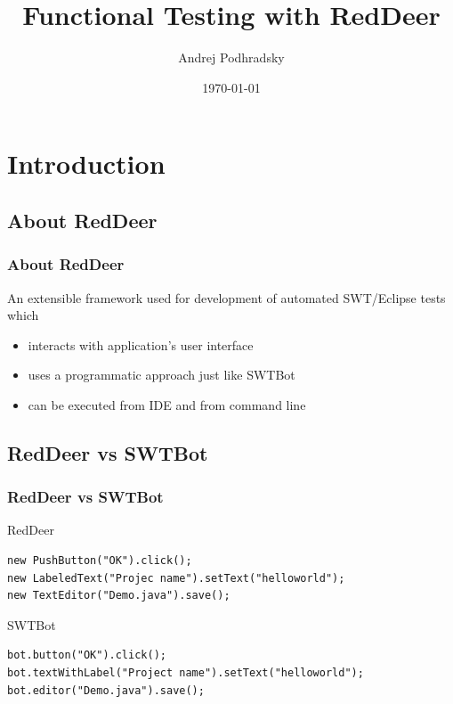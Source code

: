 \documentclass{beamer}
\begin{document}
\title{Functional Testing with RedDeer}   
\author{Andrej Podhradsky}
\date{\today} 



\frame{\titlepage} 



\section{Introduction}

\subsection{About RedDeer}
\begin{frame}[fragile]
\frametitle{About RedDeer}
An extensible framework used for development of automated SWT/Eclipse tests which
\begin{itemize}
\item interacts with application’s user interface
\item uses a programmatic approach just like SWTBot
\item can be executed from IDE and from command line
\end{itemize}
\end{frame}

\subsection{RedDeer vs SWTBot}
\begin{frame}[fragile]
\frametitle{RedDeer vs SWTBot}
RedDeer  
\begin{lstlisting}
new PushButton("OK").click();
new LabeledText("Projec name").setText("helloworld");
new TextEditor("Demo.java").save();
\end{lstlisting}
\vspace{0.5cm}
SWTBot
\begin{lstlisting}
bot.button("OK").click();
bot.textWithLabel("Project name").setText("helloworld");
bot.editor("Demo.java").save();
\end{lstlisting}
\end{frame}
\end{document}
